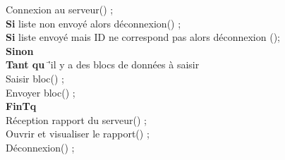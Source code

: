 \begin{tabbing}

Connexion au serveur() ; \\

\textbf{Si} liste non envoyé alors déconnexion() ; \\

\textbf{Si} liste envoyé mais ID ne correspond pas alors déconnexion ();  \\

\textbf{Sinon} \= \\

\> \textbf{Tant qu} \=’il y a des blocs de données  à saisir \\

	\> \> Saisir bloc() ; \\

	\> \>	Envoyer bloc() ;  \\

	\> \textbf{FinTq} \\
	
	Réception rapport du serveur() ; \\

	Ouvrir et visualiser le rapport() ; \\

	Déconnexion() ;

\end{tabbing}

